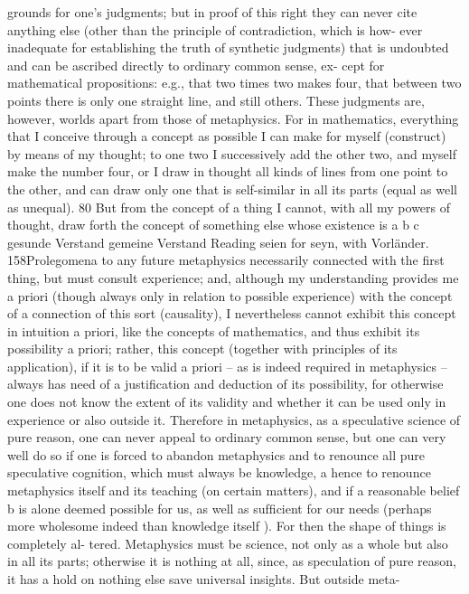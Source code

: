 grounds for one’s judgments; but in proof of this right they can never cite
anything else (other than the principle of contradiction, which is how-
ever inadequate for establishing the truth of synthetic judgments) that is
undoubted and can be ascribed directly to ordinary common sense, ex-
cept for mathematical propositions: e.g., that two times two makes four,
that between two points there is only one straight line, and still others.
These judgments are, however, worlds apart from those of metaphysics.
For in mathematics, everything that I conceive through a concept as
possible I can make for myself (construct) by means of my thought; to
one two I successively add the other two, and myself make the number
four, or I draw in thought all kinds of lines from one point to the other,
and can draw only one that is self-similar in all its parts (equal as well as
unequal). 80 But from the concept of a thing I cannot, with all my powers
of thought, draw forth the concept of something else whose existence is
a
b
c
gesunde Verstand
gemeine Verstand
Reading seien for seyn, with Vorländer.
158Prolegomena to any future metaphysics
necessarily connected with the ﬁrst thing, but must consult experience;
and, although my understanding provides me a priori (though always only
in relation to possible experience) with the concept of a connection of
this sort (causality), I nevertheless cannot exhibit this concept in intuition
a priori, like the concepts of mathematics, and thus exhibit its possibility a
priori; rather, this concept (together with principles of its application), if
it is to be valid a priori – as is indeed required in metaphysics – always has
need of a justiﬁcation and deduction of its possibility, for otherwise one
does not know the extent of its validity and whether it can be used only in
experience or also outside it. Therefore in metaphysics, as a speculative
science of pure reason, one can never appeal to ordinary common sense,
but one can very well do so if one is forced to abandon metaphysics
and to renounce all pure speculative cognition, which must always be
knowledge, a hence to renounce metaphysics itself and its teaching (on
certain matters), and if a reasonable belief b is alone deemed possible for
us, as well as sufﬁcient for our needs (perhaps more wholesome indeed
than knowledge itself ). For then the shape of things is completely al-
tered. Metaphysics must be science, not only as a whole but also in all its
parts; otherwise it is nothing at all, since, as speculation of pure reason,
it has a hold on nothing else save universal insights. But outside meta-
